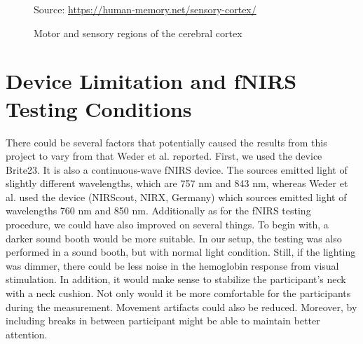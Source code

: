 \begin{figure}[H]
  \centering
           {Source: \url{https://human-memory.net/sensory-cortex/}}
  \caption{Motor and sensory regions of the cerebral cortex}
  \label{fig:CerebralCortex}
\end{figure}

\section{Device Limitation and fNIRS Testing Conditions}

There could be several factors that potentially caused the results from this project to vary from that Weder et al. \citeyearpar{Weder2018} reported. First, we used the device Brite23. It is also a continuous-wave fNIRS device. The sources emitted light of slightly different wavelengths, which are 757 nm and 843 nm, whereas Weder et al. \citeyearpar{Weder2018} used the device (NIRScout, NIRX, Germany) which sources emitted light of wavelengths 760 nm and 850 nm. Additionally as for the fNIRS testing procedure, we could have also improved on several things. To begin with, a darker sound booth would be more suitable. In our setup, the testing was also performed in a sound booth, but with normal light condition. Still, if the lighting was dimmer, there could be less noise in the hemoglobin response from visual stimulation. In addition, it would make sense to stabilize the participant's neck with a neck cushion. Not only would it be more comfortable for the participants during the measurement. Movement artifacts could also be reduced. Moreover, by including breaks in between participant might be able to maintain better attention.

